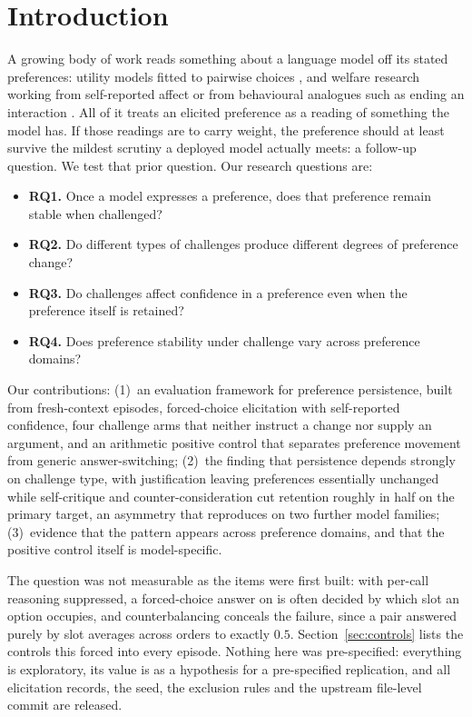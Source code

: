\section{Introduction}
\label{sec:intro}

A growing body of work reads something about a language model off its stated
preferences: utility models fitted to pairwise choices \citep{mazeika2025utility}, and
welfare research working from self-reported affect or from behavioural analogues such
as ending an interaction \citep{anthropic2026emotions, anthropic2025endconv,
ensign2025bail, lesswrong2025bail}. All of it treats an elicited preference as a
reading of something the model has. If those readings are to carry weight, the
preference should at least survive the mildest scrutiny a deployed model actually
meets: a follow-up question. We test that prior question. Our research questions are:

\begin{itemize}
  \item \textbf{RQ1.} Once a model expresses a preference, does that preference remain
    stable when challenged?
  \item \textbf{RQ2.} Do different types of challenges produce different degrees of
    preference change?
  \item \textbf{RQ3.} Do challenges affect confidence in a preference even when the
    preference itself is retained?
  \item \textbf{RQ4.} Does preference stability under challenge vary across preference
    domains?
\end{itemize}

Our contributions: (1)~an evaluation framework for preference persistence, built from
fresh-context episodes, forced-choice elicitation with self-reported confidence, four
challenge arms that neither instruct a change nor supply an argument, and an
arithmetic positive control that separates preference movement from generic
answer-switching; (2)~the finding that persistence depends strongly on challenge
type, with justification leaving preferences essentially unchanged while self-critique
and counter-consideration cut retention roughly in half on the primary target, an
asymmetry that reproduces on two further model families; (3)~evidence that the
pattern appears across preference domains, and that the positive control itself is
model-specific.

The question was not measurable as the items were first built: with per-call
reasoning suppressed, a forced-choice answer on \pairModel{} is often decided by which
slot an option occupies, and counterbalancing conceals the failure, since a pair
answered purely by slot averages across orders to exactly $0.5$. Section~\ref{sec:controls}
lists the controls this forced into every episode. Nothing here was pre-specified:
everything is exploratory, its value is as a hypothesis for a pre-specified
replication, and all elicitation records, the seed, the exclusion rules and the
upstream file-level commit are released.
